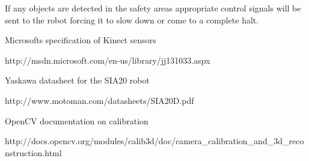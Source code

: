\documentclass[10pt,a4paper,twocolumn,english]{article}
\begin{document}
If any objects are detected in the safety areas appropriate control signals will be sent to the robot forcing it to slow down or come to a complete halt.

\clearpage

\begin{thebibliography}{9}

Microsofts specification of Kinect sensors

http://msdn.microsoft.com/en-us/library/jj131033.aspx

Yaskawa datasheet for the SIA20 robot

http://www.motoman.com/datasheets/SIA20D.pdf

OpenCV documentation on calibration

http://docs.opencv.org/modules/calib3d/doc/camera\_calibration\_and\_3d\_reconstruction.html


\end{thebibliography}
\end{document}
